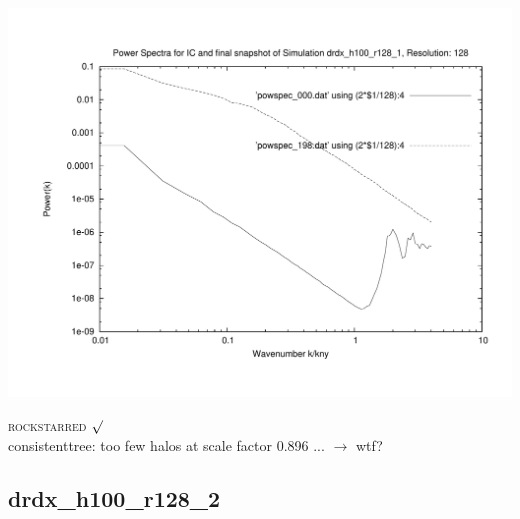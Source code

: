 \includegraphics[scale=0.5]{r128/h100/drdx_h100_r128_1/plot_powspec_drdx_h100_r128_1.pdf}


\textsc{rockstarred} $\surd$  \\
consistenttree: too few halos at scale factor 0.896 ... $\rightarrow$ wtf? 

\newpage
\subsection{drdx\_h100\_r128\_2}


